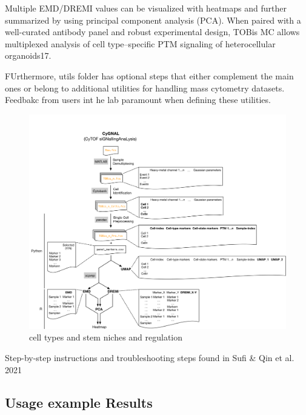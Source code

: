 Multiple EMD/DREMI values can be visualized with heatmaps and further summarized by using principal component analysis (PCA). When paired with a well-curated antibody panel and robust experimental design, TOBis MC allows multiplexed analysis of cell type–specific PTM signaling of heterocellular organoids17.


FUrthermore, utils folder has optional steps that either complement the main ones or belong to additional utilities for handling mass cytometry datasets. Feedbakc from users int he lab paramount when defining these utilities.

\begin{figure}
    \centering
    \includegraphics{03cygnal/figs/3CyGNALpipeline.png}
    \caption{cell types and stem niches and regulation}
    \label{fig:fig2}
\end{figure}

Step-by-step instructions and troubleshooting steps found in Sufi \& Qin et al. 2021 



\subsection{Usage example Results}


